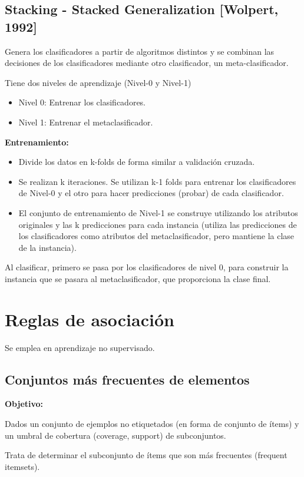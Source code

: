 \documentclass[12pt, twoside, openright]{report} %
\begin{document}
\subsection{Stacking - Stacked Generalization [Wolpert, 1992]}
Genera los clasificadores a partir de algoritmos distintos y se combinan las decisiones de los clasificadores mediante otro clasificador, un meta-clasificador.

Tiene dos niveles de aprendizaje (Nivel-0 y Nivel-1)
\begin{itemize}
	\item Nivel 0: Entrenar los clasificadores.
	\item Nivel 1: Entrenar el metaclasificador.
\end{itemize}
\pagebreak

\textbf{Entrenamiento:}
\begin{itemize}
	\item Divide los datos en k-folds de forma similar a validación cruzada.
	\item Se realizan k iteraciones. Se utilizan k-1 folds para entrenar los clasificadores de Nivel-0 y el otro para hacer predicciones (probar) de cada clasificador.
	\item El conjunto de entrenamiento de Nivel-1 se construye utilizando los atributos originales y las k predicciones para cada instancia (utiliza las predicciones de los clasificadores como atributos del metaclasificador, pero mantiene la clase de la instancia).
\end{itemize}
Al clasificar, primero se pasa por los clasificadores de nivel 0, para construir la instancia que se pasara al metaclasificador, que proporciona la clase final.

\section{Reglas de asociación}
Se emplea en aprendizaje no supervisado.

\subsection{Conjuntos más frecuentes de elementos}
\textbf{Objetivo:}

Dados un conjunto de ejemplos no etiquetados (en forma de conjunto de ítems) y un umbral de cobertura (coverage, support) de subconjuntos.

Trata de determinar el subconjunto de ítems que son más frecuentes (frequent itemsets).
\end{document}
